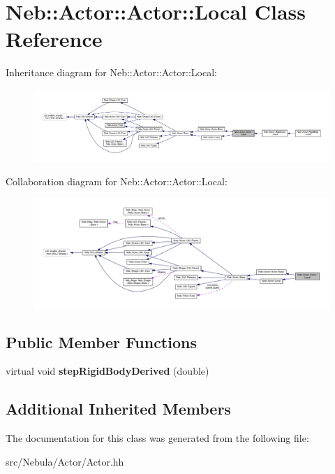 \hypertarget{classNeb_1_1Actor_1_1Actor_1_1Local}{\section{Neb\-:\-:Actor\-:\-:Actor\-:\-:Local Class Reference}
\label{classNeb_1_1Actor_1_1Actor_1_1Local}
}


Inheritance diagram for Neb\-:\-:Actor\-:\-:Actor\-:\-:Local\-:
\nopagebreak
\begin{figure}[H]
\begin{center}
\leavevmode
\includegraphics[width=350pt]{classNeb_1_1Actor_1_1Actor_1_1Local__inherit__graph}
\end{center}
\end{figure}


Collaboration diagram for Neb\-:\-:Actor\-:\-:Actor\-:\-:Local\-:
\nopagebreak
\begin{figure}[H]
\begin{center}
\leavevmode
\includegraphics[width=350pt]{classNeb_1_1Actor_1_1Actor_1_1Local__coll__graph}
\end{center}
\end{figure}
\subsection*{Public Member Functions}
\begin{DoxyCompactItemize}
\item 
\hypertarget{classNeb_1_1Actor_1_1Actor_1_1Local_a04b6e38c3f3ab0456de0c5f18a188891}{virtual void {\bfseries step\-Rigid\-Body\-Derived} (double)}\label{classNeb_1_1Actor_1_1Actor_1_1Local_a04b6e38c3f3ab0456de0c5f18a188891}

\end{DoxyCompactItemize}
\subsection*{Additional Inherited Members}


The documentation for this class was generated from the following file\-:\begin{DoxyCompactItemize}
\item 
src/\-Nebula/\-Actor/Actor.\-hh\end{DoxyCompactItemize}

